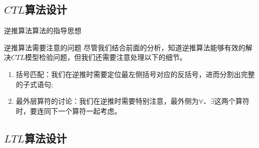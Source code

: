 \documentclass[english]{pkuslide}
\begin{document}
\subsection{$CTL$算法设计}
	\frame{\subsectionpage}
\begin{frame}{逆推算法}{算法的指导思想}




\end{frame}
\begin{frame}{逆推算法}{需要注意的问题}
尽管我们结合前面的分析，知道逆推算法能够有效的解决$CTL$模型检验问题，但我们还需要注意处理以下的细节。
\begin{enumerate}
\item 括号匹配：我们在逆推时需要定位最左侧括号对应的反括号，进而分割出完整的子式语句;
\item 最外层算符的讨论：我们在逆推时需要特别注意，最外侧为${\forall}$、${\exists}$这两个算符时，要连同下一个算符一起考虑。
\end{enumerate}
\end{frame}
\subsection{$LTL$算法设计}
	\frame{\subsectionpage}
\begin{quoteslide}

\end{quoteslide}
\end{document}

